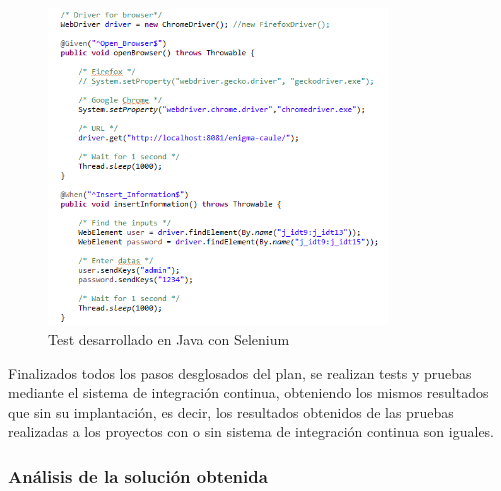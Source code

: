 \begin{figure}[!h]
\centering
   \includegraphics[width=9cm]{Test_Selenium_zz-caule.PNG}
\caption{Test desarrollado en Java con Selenium}
\end{figure}


\clearpage

Finalizados todos los pasos desglosados del plan, se realizan tests y pruebas mediante el sistema de integración continua, obteniendo los mismos resultados que sin su implantación, es decir, los resultados obtenidos de las pruebas realizadas a los proyectos con o sin sistema de integración continua son iguales.

\subsubsection{Análisis de la solución obtenida}

